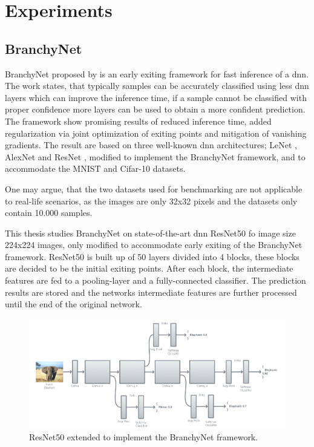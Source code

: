 \section{Experiments}

\subsection{BranchyNet}

BranchyNet \cite{teerapittayanon_branchynet:_2016} proposed by \citeauthor{teerapittayanon_branchynet:_2016} is an early exiting framework for fast inference of a \gls{dnn}. The work states, that typically samples can be accurately classified using less \gls{dnn} layers which can improve the inference time, if a sample cannot be classified with proper confidence more layers can be used to obtain a more confident prediction. The framework show promising results of reduced inference time, added regularization via joint optimization of exiting points and mitigation of vanishing gradients. The result are based on three well-known \gls{dnn} architectures; LeNet \cite{bibid}, AlexNet \cite{bibid} and ResNet \cite{he_deep_2015}, modified to implement the BranchyNet framework, and to accommodate the MNIST \cite{bibid} and Cifar-10 \cite{bibid} datasets. 

One may argue, that the two datasets used for benchmarking are not applicable to real-life scenarios, as the images are only 32x32 pixels and the datasets only contain 10.000 samples.

This thesis studies BranchyNet on state-of-the-art \gls{dnn} ResNet50 fo image size 224x224 images, only modified to accommodate early exiting of the BranchyNet framework. ResNet50 is built up of 50 layers divided into 4 blocks, these blocks are decided to be the initial exiting points. After each block, the intermediate features are fed to a pooling-layer and a fully-connected classifier. The prediction results are stored and the networks intermediate features are further processed until the end of the original network.

\begin{figure}
	\centering
	\includegraphics[width=.9\linewidth]{figures/models/BResNet.png}
	\caption[B-ResNet architecture]{ResNet50 extended to implement the BranchyNet framework.}
	\label{b-resnet}
\end{figure}

